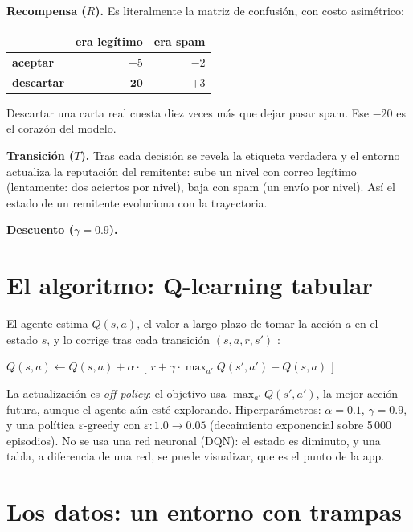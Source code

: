 \documentclass[11pt]{article}
\begin{document}
\textbf{Recompensa ($R$).} Es literalmente la matriz de confusión, con costo
asimétrico:

\begin{center}
\begin{tabular}{@{}lrr@{}}
\toprule
 & \textbf{era legítimo} & \textbf{era spam} \\
\midrule
\textbf{aceptar} & $+5$ & $-2$ \\
\textbf{descartar} & $\mathbf{-20}$ & $+3$ \\
\bottomrule
\end{tabular}
\end{center}

Descartar una carta real cuesta diez veces más que dejar pasar spam. Ese
$-20$ es el corazón del modelo.

\textbf{Transición ($T$).} Tras cada decisión se revela la etiqueta
verdadera y el entorno actualiza la reputación del remitente: sube un nivel
con correo legítimo (lentamente: dos aciertos por nivel), baja con spam (un
envío por nivel). Así el estado de un remitente evoluciona con la
trayectoria.

\textbf{Descuento ($\gamma = 0.9$).}

\section{El algoritmo: Q-learning tabular}

El agente estima $Q(s, a)$, el valor a largo plazo de tomar la acción $a$ en
el estado $s$, y lo corrige tras cada transición $(s, a, r, s')$
\cite{sutton2018,watkins1992}:

\begin{center}
$Q(s,a) \leftarrow Q(s,a) + \alpha \cdot \left[\, r + \gamma \cdot
\max_{a'} Q(s',a') - Q(s,a) \,\right]$
\end{center}

La actualización es \textit{off-policy}: el objetivo usa
$\max_{a'} Q(s',a')$, la mejor acción futura, aunque el agente aún esté
explorando. Hiperparámetros: $\alpha = 0.1$, $\gamma = 0.9$, y una política
$\varepsilon$-greedy con $\varepsilon: 1.0 \rightarrow 0.05$ (decaimiento
exponencial sobre 5\,000 episodios). No se usa una red neuronal (DQN): el
estado es diminuto, y una tabla, a diferencia de una red, se puede
visualizar, que es el punto de la app.

\section{Los datos: un entorno con trampas}
\end{document}
